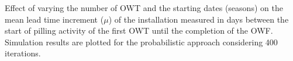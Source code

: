 \textbf{}\label{fig:Seasonaleffect}
Effect of varying the number of OWT and the starting dates (seasons) on the mean lead time increment ($\mu$) of the installation measured in days between the start of pilling activity of the first OWT until the completion of the OWF. Simulation results are plotted for the probabilistic approach considering 400 iterations.